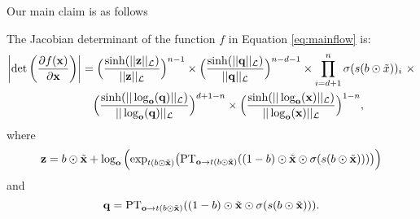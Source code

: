 Our main claim is as follows
\begin{prop}
The Jacobian determinant of the function $f$ in Equation \eqref{eq:mainflow} is:
\begin{align*}
  \left|\textnormal{det}\left(\frac{\partial f(\mathbf{x})}{\partial \mathbf{x}}\right)\right| &= \Big(\frac{\sinh(||\mathbf{z}||_{\mathcal{L}})}{||\mathbf{z}||_{\mathcal{L}}}\Big)^{n-1} \times \Big(\frac{\sinh(||\mathbf{q}||_{\mathcal{L}})}{||\mathbf{q}||_{\mathcal{L}}}\Big)^{n-d-1} \times  \prod_{i=d+1}^n\sigma(s(b \odot \tilde{x}))_i \ \times \\
    & \quad \Big(\frac{\sinh(||\log_{\textbf{o}}(\mathbf{q})||_{\mathcal{L}})}{||\log_{\textbf{o}}(\mathbf{q})||_{\mathcal{L}}}\Big)^{d+1-n} \times \Big(\frac{\sinh(||\log_{\textbf{o}}(\textbf{x})||_{\mathcal{L}})}{||\log_{\textbf{o}}(\textbf{x})||_{\mathcal{L}}}\Big)^{1-n},
\end{align*}
where 
$$
\mathbf{z} =  b \odot \tilde{
    \mathbf{x}} + \log_{\textbf{o}}\Big( \textnormal{exp}_{t(b \odot \tilde{\mathbf{x}})}\big(\textnormal{PT}_{\textbf{o}\to t(b \odot \tilde{\mathbf{x}}) }((1-b) \odot \tilde{\mathbf{x}} \odot \sigma(s(b \odot \tilde{\mathbf{x}})))\big)\Big)
$$
and
$$
 \mathbf{q} = \textnormal{PT}_{\textbf{o}\to t(b \odot \tilde{\mathbf{x}}) }((1-b) \odot \tilde{\mathbf{x}} \odot \sigma(s(b \odot \tilde{\mathbf{x}}))).
$$
\end{prop}
